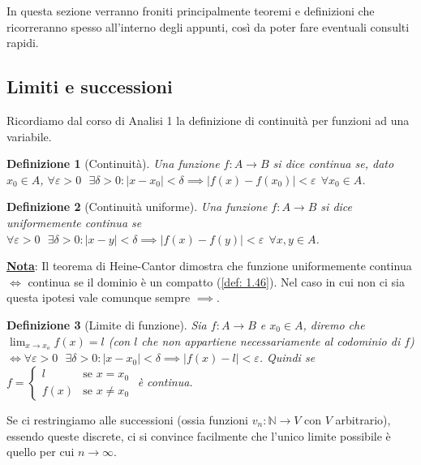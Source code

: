 \documentclass[a4paper,12pt]{report}
\newtheorem{definizione}{Definizione}[chapter]
\begin{document}
In questa sezione verranno froniti principalmente teoremi e definizioni che ricorreranno spesso all'interno degli appunti, così da poter fare eventuali consulti rapidi.

\subsection{Limiti e successioni}

Ricordiamo dal corso di Analisi 1 la definizione di continuità per funzioni ad una variabile.

\begin{definizione}[Continuità]
    Una funzione $f: A \to B$ si dice continua se, dato $x_0 \in A$,
    $\forall \varepsilon >0\ \ \  \exists \delta>0 : |x-x_0| <\delta \implies|f(x)-f(x_0)| < \varepsilon \ \ \forall x_0 \in A$.
\end{definizione}

\begin{definizione}[Continuità uniforme]\label{def: 1.31}
    Una funzione $f:A \to B$ si dice uniformemente continua se $\forall \varepsilon >0\ \ \  \exists \delta>0 : |x-y| <\delta \implies|f(x)-f(y)| < \varepsilon \ \ \forall x,y \in A$.
\end{definizione}

\underline{\textbf{Nota}}: Il teorema di Heine-Cantor dimostra che funzione uniformemente continua $\iff$ continua se il dominio è un compatto (\ref{def: 1.46}). Nel caso in cui non ci sia questa ipotesi vale comunque sempre $\boxed{\implies}$.

\begin{definizione}[Limite di funzione]
    Sia $f:A \to B$ e $x_0 \in A$, diremo che $\displaystyle\lim_{x \to x_o}f(x)=l$ (con $l$ che non appartiene necessariamente al codominio di $f$) $\iff \forall \varepsilon >0\ \ \  \exists \delta>0 : |x-x_0| <\delta \implies|f(x)-l| < \varepsilon$. Quindi se $f=\begin{cases}
        l  & \text{se }  x=x_0 \\
        f(x) & \text{se }  x \neq x_0
    \end{cases}$ è continua.
\end{definizione}

Se ci restringiamo alle successioni (ossia funzioni $v_n:\mathbb{N} \to V$ con $V$ arbitrario), essendo queste discrete, ci si convince facilmente che l'unico limite possibile è quello per cui $n \to \infty$.
\end{document}
